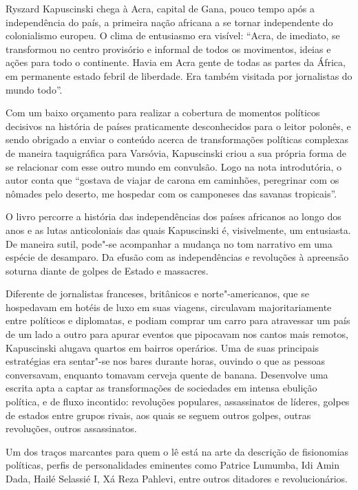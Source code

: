 Ryszard Kapuscinski chega à Acra, capital de Gana, pouco tempo após a
independência do país, a primeira nação africana a se tornar
independente do colonialismo europeu. O clima de entusiasmo era visível:
``Acra, de imediato, se transformou no centro provisório e informal de
todos os movimentos, ideias e ações para todo o continente. Havia em
Acra gente de todas as partes da África, em permanente estado febril de
liberdade. Era também visitada por jornalistas do mundo todo''.

Com um baixo orçamento para realizar a cobertura de momentos políticos
decisivos na história de países praticamente desconhecidos para o leitor
polonês, e sendo obrigado a enviar o conteúdo acerca de transformações
políticas complexas de maneira taquigráfica para Varsóvia, Kapuscinski
criou a sua própria forma de se relacionar com esse outro mundo em
convulsão. Logo na nota introdutória, o autor conta que ``gostava de
viajar de carona em caminhões, peregrinar com os nômades pelo deserto,
me hospedar com os camponeses das savanas tropicais''.

O livro percorre a história das independências dos países africanos ao
longo dos anos e as lutas anticoloniais das quais Kapuscinski é,
visivelmente, um entusiasta. De maneira sutil, pode"-se acompanhar a
mudança no tom narrativo em uma espécie de desamparo. Da efusão com as
independências e revoluções à apreensão soturna diante de golpes de
Estado e massacres.

Diferente de jornalistas franceses, britânicos e norte"-americanos, que
se hospedavam em hotéis de luxo em suas viagens, circulavam
majoritariamente entre políticos e diplomatas, e podiam comprar um carro
para atravessar um país de um lado a outro para apurar eventos que
pipocavam nos cantos mais remotos, Kapuscinski alugava quartos em
bairros operários. Uma de suas principais estratégias era
sentar"-se nos bares durante horas, ouvindo o que as pessoas conversavam,
enquanto tomavam cerveja quente de banana. Desenvolve uma escrita apta a
captar as transformações de sociedades em intensa ebulição política, e
de fluxo incontido: revoluções populares, assassinatos de líderes,
golpes de estados entre grupos rivais, aos quais se seguem outros
golpes, outras revoluções, outros assassinatos.

Um dos traços marcantes para quem o lê está na arte da descrição de
fisionomias políticas, perfis de personalidades eminentes como Patrice
Lumumba, Idi Amin Dada, Hailé Selassié I, Xá Reza Pahlevi, entre outros
ditadores e revolucionários. 

